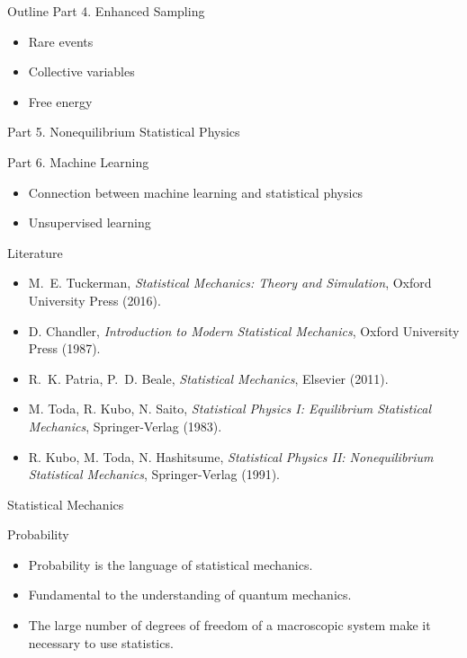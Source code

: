 \documentclass[10pt]{beamer}
\begin{document}
\begin{frame}{Outline}
\textcolor{subtitle}{Part 4. Enhanced Sampling}
\begin{itemize}
  \item Rare events
  \item Collective variables
  \item Free energy
\end{itemize}
\vspace{0.5cm}

\textcolor{subtitle}{Part 5. Nonequilibrium Statistical Physics}
\vspace{0.5cm}

\textcolor{subtitle}{Part 6. Machine Learning}
\begin{itemize}
  \item Connection between machine learning and statistical physics
  \item Unsupervised learning
\end{itemize}
\end{frame}

\begin{frame}{Literature}
\begin{itemize}
\setlength\itemsep{1em}
  \item M.~E. Tuckerman, \textit{Statistical Mechanics: Theory and Simulation}, Oxford University Press (2016).
  \item D. Chandler, \textit{Introduction to Modern Statistical Mechanics}, Oxford University Press (1987).
  \item R.~K. Patria, P.~D. Beale, \textit{Statistical Mechanics}, Elsevier (2011).
  \item M. Toda, R. Kubo, N. Saito, \textit{Statistical Physics I: Equilibrium Statistical Mechanics}, Springer-Verlag (1983).
  \item R. Kubo, M. Toda, N. Hashitsume, \textit{Statistical Physics II: Nonequilibrium Statistical Mechanics}, Springer-Verlag (1991).
\end{itemize}
\end{frame}

\begin{frame}{}
  \begin{center}
    \fontsize{25pt}{6}\selectfont\vspace{1.2cm}
    \textcolor{subtitle}{Statistical Mechanics}
  \end{center}
\end{frame}

\begin{frame}{Probability}
\begin{itemize}
\setlength\itemsep{1em}
  \item Probability is the language of statistical mechanics.
  \item Fundamental to the understanding of quantum mechanics.
  \item The large number of degrees of freedom of a macroscopic system make it necessary to use statistics.
\end{itemize}
\end{frame}
\end{document}
